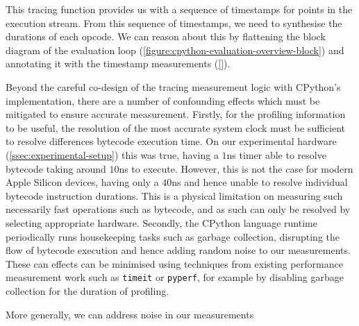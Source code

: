 This tracing function provides us with a sequence of timestamps for points in the execution stream.
From this sequence of timestamps, we need to synthesise the durations of each opcode.
We can reason about this by flattening the block diagram of the evaluation loop (\autoref{figure:cpython-evaluation-overview-block}) and annotating it with the timestamp measurements (\autoref{}).





Beyond the careful co-design of the tracing measurement logic with CPython's implementation, there are a number of confounding effects which must be mitigated to ensure accurate measurement.
Firstly, for the profiling information to be useful, the resolution of the most accurate system clock must be sufficient to resolve differences bytecode execution time. On our experimental hardware (\autoref{ssec:experimental-setup}) this was true, having a $1$ns timer able to resolve bytecode taking around $10$ns to execute. However, this is not the case for modern Apple Silicon devices, having only a $40$ns and hence unable to resolve individual bytecode instruction durations. This is a physical limitation on measuring such necessarily fast operations such as bytecode, and as such can only be resolved by selecting appropriate hardware.
Secondly, the CPython language runtime periodically runs housekeeping tasks such as garbage collection, disrupting the flow of bytecode execution and hence adding random noise to our measurements. These can effects can be minimised using techniques from existing performance measurement work such as \texttt{timeit} or \texttt{pyperf}, for example by disabling garbage collection for the duration of profiling.

More generally, we can address noise in our measurements





